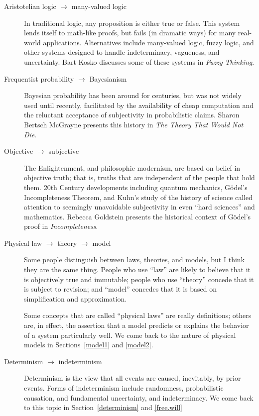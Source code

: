 \documentclass[10pt]{book}
\begin{document}
\begin{description}

\item[Aristotelian logic $\rightarrow$ many-valued logic] In
  traditional logic, any proposition is either true or false.  This
  system lends itself to math-like proofs, but fails (in dramatic
  ways) for many real-world applications.  Alternatives include
  many-valued logic, fuzzy logic, and other systems designed to handle
  indeterminacy, vagueness, and uncertainty.  Bart
  Kosko discusses some of these systems in {\em Fuzzy
    Thinking}.

\item[Frequentist probability $\rightarrow$ Bayesianism] Bayesian
  probability has been around for centuries, but was not widely used
  until recently, facilitated by the availability of cheap computation
  and the reluctant acceptance of subjectivity
  in probabilistic claims.  Sharon Bertsch McGrayne presents this
  history in {\em The Theory That Would Not Die}.

\item[Objective $\rightarrow$ subjective] The Enlightenment, and
  philosophic modernism, are based on belief in objective truth; that
  is, truths that are independent of the people that hold them.  20th
  Century developments including quantum mechanics, G\"{o}del's
  Incompleteness Theorem, and Kuhn's study of the history of science
  called attention to seemingly unavoidable subjectivity in
  even ``hard sciences'' and mathematics.  Rebecca Goldstein presents
  the historical context of G\"{o}del's proof in {\it Incompleteness}.

\item[Physical law $\rightarrow$ theory $\rightarrow$ model]
  Some people distinguish between laws, theories, and models, but
  I think they are the same thing.
  People who use ``law'' are likely to
  believe that it is objectively true and immutable; people who use
  ``theory'' concede that it is subject to revision; and ``model''
  concedes that it is based on simplification and approximation.

  Some concepts that are called ``physical laws'' are really
  definitions; others are, in effect, the assertion that a model
  predicts or explains the behavior of a system particularly well.
  We come back to the nature of physical models 
  in Sections~\ref{model1} and \ref{model2}.

\item[Determinism $\rightarrow$ indeterminism] Determinism is the view
  that all events are caused, inevitably, by prior events.  Forms of
  indeterminism include randomness, probabilistic causation, and
  fundamental uncertainty, and indeterminacy.  We come back to this
  topic in Section~\ref{determinism} and \ref{free.will}

\end{description}
\end{document}
